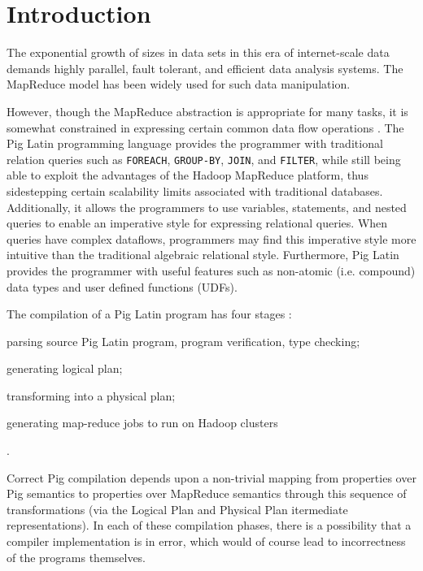 \section{Introduction}
\label{sec:intro}

{\bf}

The exponential growth of sizes in data sets in this era of internet-scale data demands highly parallel, fault tolerant, and efficient data analysis systems. The MapReduce model \cite{dean2004mapreduce} \cite{dean2010mapreduce} has been widely used for such data manipulation.

However, though the MapReduce abstraction is appropriate for many tasks, it is somewhat constrained in expressing certain common data flow operations \cite{olston2008pig}. The Pig Latin programming language \cite{olston2008pig} provides the programmer with traditional relation queries such as \texttt{FOREACH}, \texttt{GROUP-BY}, \texttt{JOIN}, and \texttt{FILTER}, while
still being able to exploit the advantages of the Hadoop MapReduce platform, thus sidestepping certain scalability limits associated with traditional databases. Additionally, it allows the programmers to use variables, statements, and nested queries to enable an imperative style for expressing relational queries. When queries have complex dataflows, programmers may find this imperative style more intuitive than the traditional algebraic relational style. Furthermore, Pig Latin provides the programmer with useful features such as non-atomic (i.e. compound) data types and user defined functions (UDFs).

The compilation of a Pig Latin program has four stages \cite{gates2009building}: \begin{enumerate*}[label=\itshape\alph*\upshape)] \item parsing source Pig Latin program, program verification, type checking; \item generating logical plan; \item transforming into a physical plan; \item generating map-reduce jobs to run on Hadoop clusters \end{enumerate*}.

Correct Pig compilation depends upon a non-trivial mapping from properties over Pig semantics to properties over MapReduce semantics through this sequence of transformations (via the Logical Plan and Physical Plan itermediate representations). In each of these compilation phases, there is a possibility that a compiler implementation is in error, which would of course lead to incorrectness of the programs themselves.

